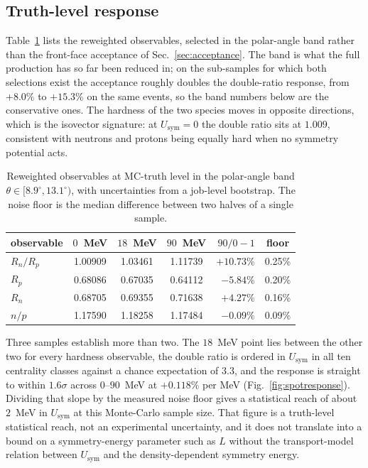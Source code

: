 \documentclass[aps,prc,twocolumn,superscriptaddress,showpacs,%
               nofootinbib,floatfix,longbibliography]{revtex4-2}
\newcommand{\Usym}{U_{\text{sym}}}
\begin{document}
\subsection{Truth-level response}
\label{sec:truthscan}

Table~\ref{tab:truthscan} lists the reweighted observables, selected in
the polar-angle band rather than the front-face acceptance of
Sec.~\ref{sec:acceptance}.  The band is what the full production has so
far been reduced in; on the sub-samples for which both selections exist
the acceptance roughly doubles the double-ratio response, from $+8.0\%$
to $+15.3\%$ on the same events, so the band numbers below are the
conservative ones.  The
hardness of the two species moves in opposite directions, which is the
isovector signature: at $\Usym = 0$ the double ratio sits at
$1.009$, consistent with neutrons and protons being equally hard when
no symmetry potential acts.

\begin{table}[!t]
  \centering
  \caption{Reweighted observables at MC-truth level in the polar-angle
    band $\theta \in [8.9^\circ, 13.1^\circ)$, with uncertainties
    from a job-level bootstrap.  The noise floor is the median
    difference between two halves of a single sample.}
  \label{tab:truthscan}
  \begin{ruledtabular}
  \begin{tabular}{lcccrc}
    observable & $0$~MeV & $18$~MeV & $90$~MeV & $90/0-1$ & floor \\
    \hline
    $R_n/R_p$ & 1.00909 & 1.03461 & 1.11739 & $+10.73\%$ & 0.25\% \\
    $R_p$     & 0.68086 & 0.67035 & 0.64112 & $-5.84\%$  & 0.20\% \\
    $R_n$     & 0.68705 & 0.69355 & 0.71638 & $+4.27\%$  & 0.16\% \\
    $n/p$     & 1.17590 & 1.18258 & 1.17484 & $-0.09\%$  & 0.09\% \\
  \end{tabular}
  \end{ruledtabular}
\end{table}

Three samples establish more than two.  The $18$~MeV point lies between
the other two for every hardness observable, the double ratio is ordered
in $\Usym{}$ in all ten centrality classes against a chance expectation
of $3.3$, and the response is straight to within $1.6\sigma$ across
$0$--$90$~MeV at $+0.118\%$ per MeV (Fig.~\ref{fig:spotresponse}).
Dividing that slope by the measured noise floor gives a statistical
reach of about $2$~MeV in $\Usym{}$ at this Monte-Carlo sample size.
That figure is a truth-level statistical reach, not an experimental
uncertainty, and it does not translate into a bound on a symmetry-energy
parameter such as $L$ without the transport-model relation between
$\Usym{}$ and the density-dependent symmetry energy.
\end{document}
